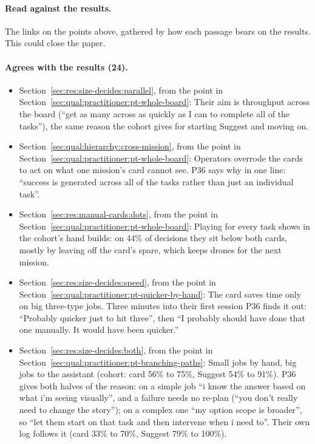 
\label{sec:qual:practitioner:against-results}\paragraph{Read against the results.}
The links on the points above, gathered by how each passage bears on the results. This could close the paper.

\paragraph*{Agrees with the results (24).}
\begin{itemize}[leftmargin=1.2em,itemsep=1pt]\small
\item Section~\ref{sec:res:size-decides:parallel}, from the point in Section~\ref{sec:qual:practitioner:pt-whole-board}: Their aim is throughput across the board (``get as many across as quickly as I can to complete all of the tasks''), the same reason the cohort gives for starting Suggest and moving on.
\item Section~\ref{sec:qual:hierarchy:cross-mission}, from the point in Section~\ref{sec:qual:practitioner:pt-whole-board}: Operators overrode the cards to act on what one mission's card cannot see. P36 says why in one line: ``success is generated across all of the tasks rather than just an individual task''.
\item Section~\ref{sec:res:manual-cards:dots}, from the point in Section~\ref{sec:qual:practitioner:pt-whole-board}: Playing for every task shows in the cohort's hand builds: on 44\% of decisions they sit below both cards, mostly by leaving off the card's spare, which keeps drones for the next mission.
\item Section~\ref{sec:res:size-decides:speed}, from the point in Section~\ref{sec:qual:practitioner:pt-quicker-by-hand}: The card saves time only on big three-type jobs. Three minutes into their first session P36 finds it out: ``Probably quicker just to hit three'', then ``I probably should have done that one manually. It would have been quicker.''
\item Section~\ref{sec:res:size-decides:both}, from the point in Section~\ref{sec:qual:practitioner:pt-branching-paths}: Small jobs by hand, big jobs to the assistant (cohort: card 56\% to 75\%, Suggest 54\% to 91\%). P36 gives both halves of the reason: on a simple job ``i know the answer based on what i'm seeing visually'', and a failure needs no re-plan (``you don't really need to change the story''); on a complex one ``my option scope is broader'', so ``let them start on that task and then intervene when i need to''. Their own log follows it (card 33\% to 70\%, Suggest 79\% to 100\%).

\end{itemize}
